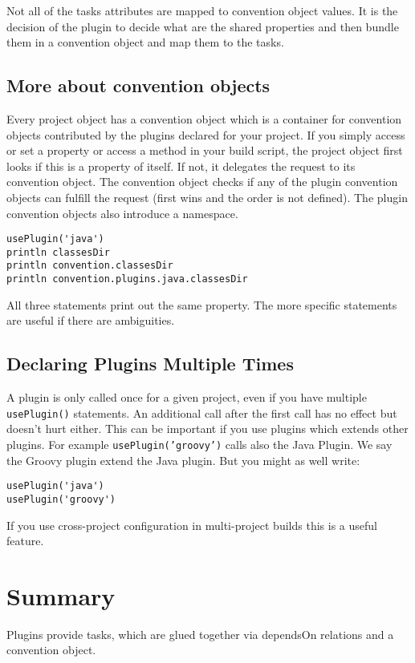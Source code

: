 Not all of the tasks attributes are mapped to convention object values. It is the decision of the plugin to decide what are the shared properties and then bundle them in a convention object and map them to the tasks.

\subsection{More about convention objects} %
\label{sub:more_about_convention_objects}
Every project object has a convention object which is a container for convention objects contributed by the plugins declared for your project. If you simply access or set a property or access a method in your build script, the project object first looks if this is a property of itself. If not, it delegates the request to its convention object. The convention object checks if any of the plugin convention objects can fulfill the request (first wins and the order is not defined). The plugin convention objects also introduce a namespace.   
\begin{Verbatim}
usePlugin('java')
println classesDir
println convention.classesDir
println convention.plugins.java.classesDir
\end{Verbatim}   
All three statements print out the same property. The more specific statements are useful if there are ambiguities.  

\subsection{Declaring Plugins Multiple Times} %
\label{sub:declaring_plugins_multiple_times}
A plugin is only called once for a given project, even if you have multiple \texttt{usePlugin()} statements. An additional call after the first call has no effect but doesn't hurt either. This can be important if you use plugins which extends other plugins. For example \texttt{usePlugin('groovy')} calls also the Java Plugin. We say the Groovy plugin extend the Java plugin. But you might as well write:
\begin{Verbatim}
usePlugin('java')
usePlugin('groovy')
\end{Verbatim}
If you use cross-project configuration in multi-project builds this is a useful feature.

\section{Summary} %
Plugins provide tasks, which are glued together via dependsOn relations and a convention object. 

